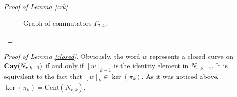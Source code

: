 \documentclass[11pt]{amsart}
\theoremstyle{plain}
\theoremstyle{definition}
\numberwithin{equation}{section}
\newcommand{\Cay}{\text{\bf Cay}}
\newcommand{\N}{N_{r,k}}
\newcommand{\JJ}{\mathcal{J}_{r,k}}
\newcommand{\Cent}{\text{Cent}}
\begin{document}
\begin{proof}[Proof of Lemma \ref{crk}]
    

   \begin{figure}[h]
\caption{Graph of commutators $\Gamma_{2,4}$.}
\label{commies}
\end{figure}
\end{proof}


\begin{proof}[Proof of Lemma \ref{closed}]
Obviously, the word $w$ represents a closed curve on $\Cay(N_{r,k-1})$ if and only if $[w]_{k-1}$ is the identity element in $N_{r,k-1}$. It is equivalent to the fact that $[w]_k \in \ker(\pi_k)$. As it was noticed above, $\ker(\pi_k)=\Cent(\N)$.
\end{proof}
\end{document}
